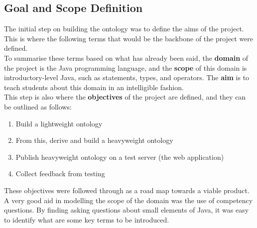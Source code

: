 \documentclass[12pt]{report}
\begin{document}
	\subsection{Goal and Scope Definition}
	The initial step on building the ontology was to define the aims of the project. This is where the following terms that would be the backbone of the project were defined.\\
	To summarise these terms based on what has already been said, the \textbf{domain} of the project is the Java programming language, and the \textbf{scope} of this domain is introductory-level Java, such as statements, types, and operators. The \textbf{aim} is to teach students about this domain in an intelligible fashion.\\
	This step is also where the \textbf{objectives} of the project are defined, and they can be outlined as follows:
	\begin{enumerate}
	    \item Build a lightweight ontology
        \item From this, derive and build a heavyweight ontology
        \item Publish heavyweight ontology on a test server (the web application)
        \item Collect feedback from testing
    \end{enumerate}
	These objectives were followed through as a road map towards a viable product.\\
	A very good aid in modelling the scope of the domain was the use of competency questions. By finding asking questions about small elements of Java, it was easy to identify what are some key terms to be introduced.
\end{document}
